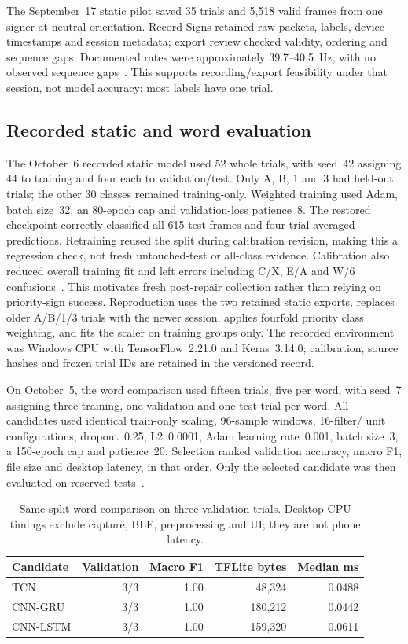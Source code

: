 \documentclass[11pt,letterpaper]{article}
\begin{document}
The September~17 static pilot saved 35 trials and 5,518 valid frames from one
signer at neutral orientation. Record Signs retained raw packets, labels,
device timestamps and session metadata; export review checked validity,
ordering and sequence gaps. Documented rates were approximately 39.7--40.5~Hz,
with no observed sequence gaps~\cite{pilot}. This supports recording/export
feasibility under that session, not model accuracy; most labels have one trial.

\subsection{Recorded static and word evaluation}
The October~6 recorded static model used 52 whole trials, with seed~42 assigning
44 to training and four each to validation/test. Only A, B, 1 and 3 had held-out
trials; the other 30 classes remained training-only. Weighted training used
Adam, batch size~32, an 80-epoch cap and validation-loss patience~8. The restored
checkpoint correctly classified all 615 test frames and four trial-averaged
predictions. Retraining reused the split during calibration revision, making
this a regression check, not fresh untouched-test or all-class evidence.
Calibration also reduced overall training fit and left errors including C/X,
E/A and W/6 confusions~\cite{staticrecord}. This motivates fresh post-repair
collection rather than relying on priority-sign success. Reproduction uses the
two retained static exports, replaces older A/B/1/3 trials with the newer
session, applies fourfold priority class weighting, and fits the scaler on
training groups only. The recorded environment was Windows CPU with
TensorFlow~2.21.0 and Keras~3.14.0; calibration, source hashes and frozen trial
IDs are retained in the versioned record.

On October~5, the word comparison used fifteen trials, five per word, with
seed~7 assigning three training, one validation and one test trial per word.
All candidates used identical train-only scaling, 96-sample windows, 16-filter/
unit configurations, dropout~0.25, L2~0.0001, Adam learning rate~0.001, batch
size~3, a 150-epoch cap and patience~20. Selection ranked validation accuracy,
macro F1, file size and desktop latency, in that order. Only the selected
candidate was then evaluated on reserved tests~\cite{wordrecord}.

\begin{table}[H]
\centering\small
\begin{tabularx}{\linewidth}{@{}Yrrrr@{}}
\toprule
\textbf{Candidate} & \textbf{Validation} & \textbf{Macro F1} & \textbf{TFLite bytes} & \textbf{Median ms}\\
\midrule
TCN & 3/3 & 1.00 & 48,324 & 0.0488\\
CNN-GRU & 3/3 & 1.00 & 180,212 & 0.0442\\
CNN-LSTM & 3/3 & 1.00 & 159,320 & 0.0611\\
\bottomrule
\end{tabularx}
\caption{Same-split word comparison on three validation trials. Desktop CPU
timings exclude capture, BLE, preprocessing and UI; they are not phone latency.}
\label{tab:comparison}
\end{table}
\end{document}
